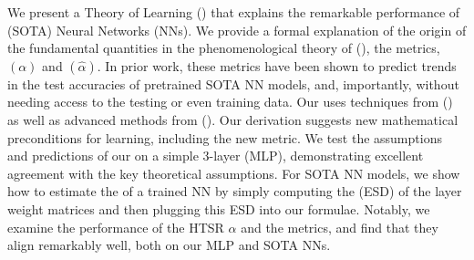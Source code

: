 We present a \SemiEmpirical Theory of Learning (\SETOL)
that explains the remarkable performance of \StateOfTheArt (SOTA) Neural Networks (NNs).
We provide a formal explanation of the origin of the
fundamental quantities in the phenomenological theory of  \HeavyTailedSelfRegularization (\HTSR), the 
\HeavyTailed \PowerLaw \LayerQuality metrics,
\ALPHAHAT $(\alpha)$ and \ALPHAHAT $(\hat{\alpha})$.
In prior work, these metrics have been shown to predict trends in the test accuracies of pretrained SOTA NN models,
and, importantly,  without needing access to the testing or even training data.
Our \SETOL
uses techniques from \StatisticalMechanics (\STATMECH) as well as advanced methods from \RandomMatrixTheory (\RMT). Our derivation suggests new mathematical preconditions for \emph{\Ideal} learning, including the new \TRACELOG metric.
We test the assumptions and predictions of our \SETOL on a simple 3-layer
\MultiLayer \Perceptron (MLP), demonstrating excellent agreement with the key theoretical assumptions. 
For SOTA NN models, we show how to estimate the \ModelQuality of a trained NN by simply computing the \EmpiricalSpectralDensity (ESD) of the layer weight matrices and
then plugging this ESD into our \SETOL formulae.
Notably, we examine the performance of the HTSR $\alpha$ and the \SETOL \TRACELOG \LayerQuality metrics, and find that they align
remarkably well, both on our MLP and SOTA NNs.


